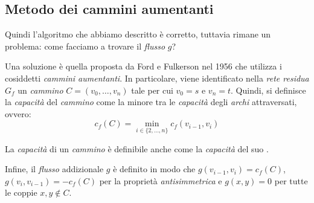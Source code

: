 \subsection{Metodo dei cammini aumentanti}
Quindi l'algoritmo che abbiamo descritto è corretto, tuttavia rimane un problema:
come facciamo a trovare il \emph{flusso} $g$?

Una soluzione è quella proposta da Ford e Fulkerson nel 1956 che utilizza i
cosiddetti \emph{cammini aumentanti}. In particolare, viene identificato nella
\emph{rete residua} $G_f$ un \emph{cammino} $C=(v_0,\dots,v_n)$ tale per cui
$v_0=s$ e $v_n=t$. Quindi, si definisce la \emph{capacità} del \emph{cammino}
come la minore tra le \emph{capacità} degli \emph{archi} attraversati, ovvero:
\[c_f(C)=\min_{i\in\{2,\dots,n\}}c_f(v_{i-1},v_i)\]

\begin{note}
    La \emph{capacità} di un \emph{cammino} è definibile anche come la
    \emph{capacità} del suo .
\end{note}

\noindent
Infine, il \emph{flusso} addizionale $g$ è definito in modo che $g(v_{i-1},v_i)=
c_f(C)$, $g(v_i,v_{i-1})=-c_f(C)$ per la proprietà \emph{antisimmetrica} e
$g(x,y)=0$ per tutte le coppie $x,y\notin C$.

